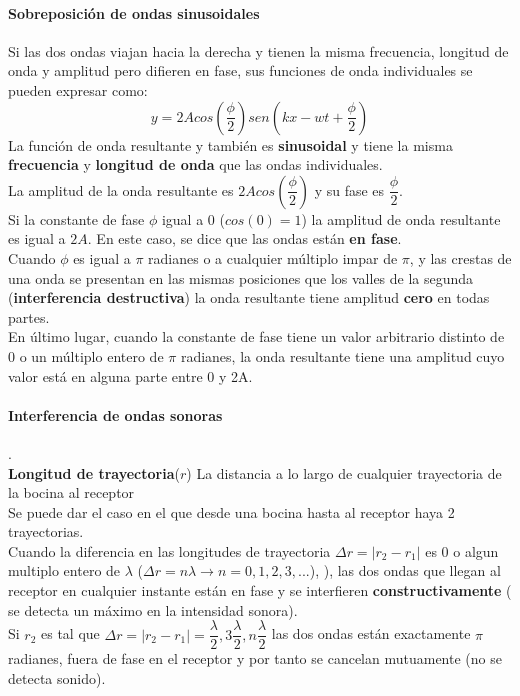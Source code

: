 \documentclass[10pt]{article}
\begin{document}
\paragraph{Sobreposición de ondas sinusoidales}
Si las dos ondas viajan hacia la derecha y tienen
la misma frecuencia, longitud de onda y amplitud pero difieren en fase, sus funciones de
onda individuales se pueden expresar como:
\begin{equation*}
	y = 2Acos\left( \dfrac{\phi}{2} \right)sen\left( kx-wt+  \dfrac{\phi}{2} \right)
\end{equation*}
La función de onda resultante y
también es \textbf{sinusoidal} y tiene la misma \textbf{frecuencia} y \textbf{longitud de onda}
 que las ondas individuales.\\
La amplitud de la onda resultante es $2Acos\left( \dfrac{\phi}{2} \right)$  y su fase
es $\dfrac{\phi}{2}$.\\
Si la constante de fase $\phi$ igual a 0 ($cos(0) = 1$) la amplitud de onda resultante es igual a $2A$. En
este caso, se dice que las ondas están \textbf{en fase}.\\
\linebreak
Cuando $\phi$ es igual a $\pi$ radianes o a cualquier múltiplo impar de $\pi$, y las crestas de una onda se presentan en las mismas posiciones que los valles de la segunda (\textbf{interferencia destructiva})  la onda resultante tiene amplitud \textbf{cero} en todas partes.\\
\linebreak
En último lugar, cuando la constante de fase tiene un valor arbitrario distinto de 0 o un múltiplo entero de
$\pi$ radianes, la onda resultante tiene una amplitud cuyo valor está en alguna
parte entre 0 y 2A.\\

\paragraph{Interferencia de ondas sonoras}.\\
\textbf{Longitud de trayectoria}($r$) La distancia a lo largo de cualquier
trayectoria de la bocina al receptor\\
Se puede dar el caso en el que desde una bocina hasta al receptor haya 2 trayectorias.\\
Cuando la diferencia en las longitudes de trayectoria $\Delta r = |r_2-r_1|$ es $0$ o algun 
multiplo entero de $\lambda$ ($\Delta r = n\lambda \rightarrow n = 0,1,2,3,...$), ), las dos ondas que 
llegan al receptor en cualquier instante están en fase y se interfieren \textbf{constructivamente} ( se detecta un máximo en la intensidad sonora).\\
\linebreak
Si $r_2$ es tal que $\Delta r = |r_2-r_1| = \dfrac{\lambda}{2}, 3\dfrac{\lambda}{2}, n\dfrac{\lambda}{2} $  las dos ondas están exactamente $\pi$ radianes, fuera de fase en el receptor y por tanto se cancelan mutuamente (no se detecta sonido).
\end{document}
